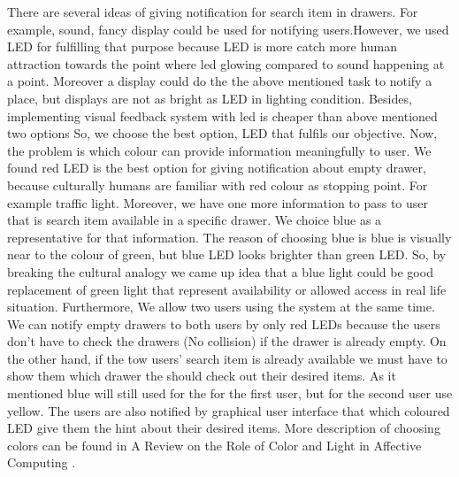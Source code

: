 There are several ideas of giving notification for search item in drawers. For example, sound, fancy display could be used for notifying users.However, we used LED for fulfilling that purpose because LED is more catch more human attraction towards the point where led glowing compared to sound happening at a point. Moreover a display could do the the above mentioned task to notify a place, but displays are not as bright as LED  in lighting condition. Besides, implementing visual feedback system with led is cheaper than above mentioned two options So, we choose the best option, LED that fulfils our objective. Now, the problem is which colour can provide information meaningfully to user. We found red LED is the best option for giving notification about empty drawer, because culturally humans are familiar with red colour as stopping point. For example traffic light. Moreover, we have one more information to pass to user that is search item available in a specific drawer. We choice blue as a representative for that information. The reason of choosing blue is blue is visually near to the colour of green, but blue LED looks brighter than green LED. So, by breaking the cultural analogy we came up idea that a blue light could be good replacement of green light that represent availability or allowed access in real life situation. Furthermore, We allow two users using the system at the same time. We can notify empty drawers to both users by only red LEDs because the users don't have to check the drawers (No collision) if the drawer is already empty. On the other hand, if the tow users' search item is already available we must have to show them which drawer the should check out their desired items. As it mentioned blue will still used  for the for the first user, but for the second user use yellow.  The users are also notified by graphical user interface that which coloured LED give them the hint about their desired items. More description of choosing colors can be found in A Review on the Role of Color and Light in Affective Computing \cite{RefWorks:coloreffect}.